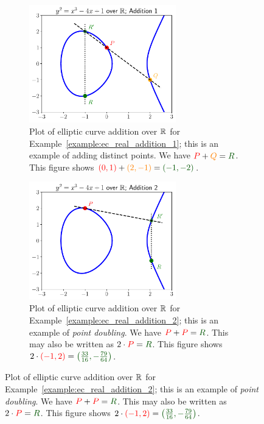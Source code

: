 \begin{figure}[p]
\centering
    \begin{subfigure}[t]{\textwidth}
        \centering
    \includegraphics[width=0.70\textwidth]{plots/ec_reals/ec_reals_addition_1.pdf}
    \caption{Plot of elliptic curve addition over $\mathbb{R}$ for
        Example~\ref{example:ec_real_addition_1};
        this is an example of adding distinct points.
        We have
        $\textcolor{red}{P} + \textcolor{orange}{Q} =
        \textcolor[rgb]{0,0.33,0}{R}$.
        This figure shows
        $\textcolor{red}{\parens{0,1}} + \textcolor{orange}{\parens{2,-1}}
        = \textcolor[rgb]{0,0.33,0}{\parens{-1,-2}}$.}
    \label{fig:ec_real_plots_addition_1}
    \end{subfigure}

    \begin{subfigure}[t]{\textwidth}
        \centering
    \includegraphics[width=0.70\textwidth]{plots/ec_reals/ec_reals_addition_2.pdf}
    \caption{Plot of elliptic curve addition over $\mathbb{R}$ for
        Example~\ref{example:ec_real_addition_2};
        this is an example of \emph{point doubling}.
        We have
        $\textcolor{red}{P} + \textcolor{red}{P} =
        \textcolor[rgb]{0,0.33,0}{R}$.
        This may also be written as
        $2\cdot\textcolor{red}{P} = \textcolor[rgb]{0,0.33,0}{R}$.
        This figure shows
        $2\cdot\textcolor{red}{\parens{-1,2}}
        = \textcolor[rgb]{0,0.33,0}{\parens{\frac{33}{16},-\frac{79}{64}}}$.}
    \label{fig:ec_real_plots_addition_2}
    \end{subfigure}


\end{figure}

